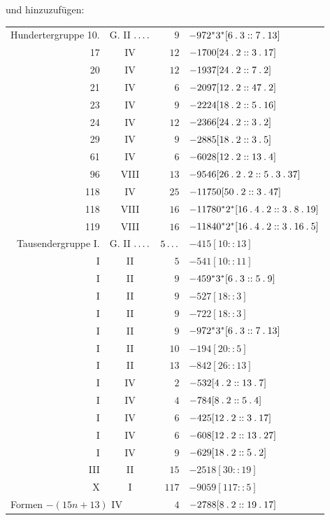 \par{}und hinzuzufügen:
\begin{longtable}{rcrl}
Hundertergruppe 10. & G. II $\mathinner{.\,.\,.\,.}$ & $9$ & $-972{}^{*}3^{*}[6\mathbin{.}3::7\mathbin{.}13]$ \\
17 & IV & $12$ & $-1700[24\mathbin{.}2::3\mathbin{.}17]$ \\
20 & IV & $12$ & $-1937[24\mathbin{.}2::7\mathbin{.}2]$ \\
21 & IV & $6$ & $-2097[12\mathbin{.}2::47\mathbin{.}2]$ \\
23 & IV & $9$ & $-2224[18\mathbin{.}2::5\mathbin{.}16]$ \\
24 & IV & $12$ & $-2366[24\mathbin{.}2::3\mathbin{.}2]$ \\
29 & IV & $9$ & $-2885[18\mathbin{.}2::3\mathbin{.}5]$ \\
61 & IV & $6$ & $-6028[12\mathbin{.}2::13\mathbin{.}4]$ \\
96 & VIII & $13$ & $-9546[26\mathbin{.}2\mathbin{.}2::5\mathbin{.}3\mathbin{.}37]$ \\
118 & IV & $25$ & $-11750[50\mathbin{.}2::3\mathbin{.}47]$ \\
118 & VIII & $16$ & $-11780{}^{*}2^{*}[16\mathbin{.}4\mathbin{.}2::3\mathbin{.}8\mathbin{.}19]$ \\
119 & VIII & $16$ & $-11840{}^{*}2^{*}[16\mathbin{.}4\mathbin{.}2::3\mathbin{.}16\mathbin{.}5]$ \\
Tausendergruppe I. & G. II $\mathinner{.\,.\,.\,.}$ & $5\mathinner{.\,.\,.}$ & $-415[10::13]$ \\
I & II & $5$ & $-541[10::11]$ \\
I & II & $9$ & $-459{}^{*}3^{*}[6\mathbin{.}3::5\mathbin{.}9]$ \\
I & II & $9$ & $-527[18::3]$ \\
I & II & $9$ & $-722[18::3]$ \\
I & II & $9$ & $-972{}^{*}3^{*}[6\mathbin{.}3::7\mathbin{.}13]$ \\
I & II & $10$ & $-194[20::5]$ \\
I & II & $13$ & $-842[26::13]$ \\
I & IV & $2$ & $-532[4\mathbin{.}2::13\mathbin{.}7]$ \\
I & IV & $4$ & $-784[8\mathbin{.}2::5\mathbin{.}4]$ \\
I & IV & $6$ & $-425[12\mathbin{.}2::3\mathbin{.}17]$ \\
I & IV & $6$ & $-608[12\mathbin{.}2::13\mathbin{.}27]$ \\
I & IV & $9$ & $-629[18\mathbin{.}2::5\mathbin{.}2]$ \\
III & II & $15$ & $-2518[30::19]$ \\
X & I & $117$ & $-9059[117::5]$ \\
\multicolumn{2}{l}{Formen $-(15n+13)$ IV} & $4$ & $-2788[8\mathbin{.}2::19\mathbin{.}17]$ \\
\end{longtable}
